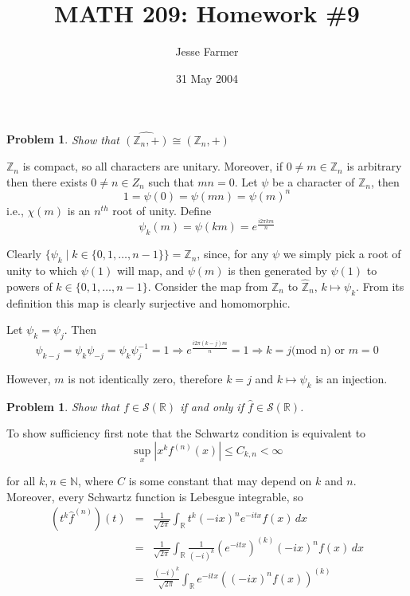 \documentclass[letterpaper,11pt]{article}
\title{MATH 209: Homework \#9}
\author{Jesse Farmer}
\date{31 May 2004}
\newtheorem{problem}[theorem]{Problem}
\newcommand{\R}{\mathbb{R}}
\newcommand{\N}{\mathbb{N}}
\newcommand{\Z}{\mathbb{Z}}
\begin{document}
\maketitle
\begin{problem} 
Show that $\widehat{\left(\Z_n,+\right)} \cong \left(\Z_n,+\right)$
\end{problem}

$\Z_n$ is compact, so all characters are unitary.  Moreover, if $0 \neq m \in \Z_n$ is arbitrary then there exists $0 \neq n \in Z_n$ such that $mn = 0$.  Let $\psi$ be a character of $\Z_n$, then
\[
1 = \psi(0) = \psi(mn) = \psi(m)^n
\]
i.e., $\chi(m)$ is an $n^{th}$ root of unity.  Define 
\[
\psi_k(m) = \psi(km) = e^{\frac{i 2 \pi km}{n}}
\]

Clearly $\big\{ \psi_k \mid k \in \{0,1,\ldots,n-1\}\big\} = \widehat{\Z}_n$, since, for any $\psi$ we simply pick a root of unity to which $\psi(1)$ will map, and $\psi(m)$ is then generated by $\psi(1)$ to powers of $k \in \{0,1,\ldots,n-1\}$.  Consider the map from $\Z_n$ to $\widehat{\Z}_n$, $k \mapsto \psi_k$.  From its definition this map is clearly surjective and homomorphic.

Let $\psi_k = \psi_j$.  Then
\[
\psi_{k-j} = \psi_k\psi_{-j} = \psi_k \psi_j^{-1} = 1 \Rightarrow e^{\frac{i2\pi(k-j)m}{n}} = 1 \Rightarrow k=j \mbox{(mod n)} \mbox{ or } m = 0
\]

However, $m$ is not identically zero, therefore $k=j$ and $k \mapsto \psi_k$ is an injection.

\begin{problem}
Show that $f \in \mathcal{S}(\R)$ if and only if $\widehat{f} \in \mathcal{S}(\R)$.
\end{problem}

To show sufficiency first note that the Schwartz condition is equivalent to
\[
\sup_x |x^k f^{(n)}(x)| \leq C_{k,n} < \infty
\]

for all $k,n \in \N$, where $C$ is some constant that may depend on $k$ and $n$.  Moreover, every Schwartz function is Lebesgue integrable, so
\begin{eqnarray*}
(t^k \widehat{f}^{(n)})(t) &=& \frac{1}{\sqrt{2\pi}} \int_\R t^k (-ix)^n e^{-itx} f(x) \,dx \\
&=&\frac{1}{\sqrt{2\pi}} \int_\R \frac{1}{(-i)^k} \left(e^{-itx}\right)^{(k)} (-ix)^nf(x) \,dx \\
&=& \frac{(-i)^k}{\sqrt{2\pi}} \int_\R e^{-itx} \left((-ix)^nf(x)\right)^{(k)}
\end{eqnarray*}
\end{document}
